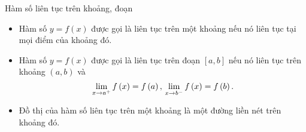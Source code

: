 \begin{dang}{Hàm số liên tục trên khoảng, đoạn}
	\begin{itemize}
		\item Hàm số $y=f(x)$ được gọi là liên tục trên một khoảng nếu nó liên tục tại mọi điểm của khoảng đó.
		\item Hàm số $y=f(x)$ được gọi là liên tục trên đoạn $[a,b]$ nếu nó liên tục trên khoảng $(a,b)$ và $$\mathop {\lim }\limits_{x \to {a^ + }} f\left( x \right) = f\left( a \right),{\rm{   }}\mathop {\lim }\limits_{x \to {b^ - }} f\left( x \right) = f\left( b \right).$$
		\item Đồ thị của hàm số liên tục trên một khoảng là một đường liền nét trên khoảng đó.
	\end{itemize}
\end{dang}
